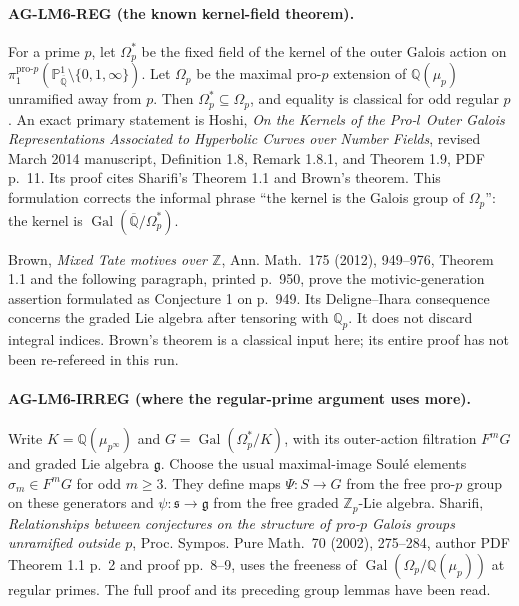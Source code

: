 \documentclass[11pt,a4paper]{article}
\begin{document}
\paragraph{AG-LM6-REG (the known kernel-field theorem).}
For a prime $p$, let $\Omega_p^*$ be the fixed field of the kernel
of the outer Galois action on
$\pi_1^{\mathrm{pro}\text{-}p}
(\mathbb P^1_{\overline{\mathbb Q}}\setminus\{0,1,\infty\})$.
Let $\Omega_p$ be the maximal pro-$p$ extension of
$\mathbb Q(\mu_p)$ unramified away from $p$. Then
$\Omega_p^*\subseteq\Omega_p$, and equality is classical for odd
regular $p$. An exact primary statement is Hoshi,
\emph{On the Kernels of the Pro-$l$ Outer Galois Representations
Associated to Hyperbolic Curves over Number Fields}, revised March
2014 manuscript, Definition 1.8, Remark 1.8.1, and Theorem 1.9,
PDF p.~11. Its proof cites Sharifi's Theorem 1.1 and Brown's theorem.
This formulation corrects the informal phrase ``the kernel is the
Galois group of $\Omega_p$'': the kernel is
$\operatorname{Gal}(\overline{\mathbb Q}/\Omega_p^*)$.

Brown, \emph{Mixed Tate motives over $\mathbb Z$}, Ann. Math.~175
(2012), 949--976, Theorem 1.1 and the following paragraph, printed
p.~950, prove the motivic-generation assertion formulated as
Conjecture 1 on p.~949. Its Deligne--Ihara consequence concerns the
graded Lie algebra after tensoring with $\mathbb Q_p$. It does not
discard integral indices. Brown's theorem is a classical input here;
its entire proof has not been re-refereed in this run.

\paragraph{AG-LM6-IRREG (where the regular-prime argument uses more).}
Write $K=\mathbb Q(\mu_{p^\infty})$ and
$G=\operatorname{Gal}(\Omega_p^*/K)$, with its outer-action
filtration $F^mG$ and graded Lie algebra $\mathfrak g$.
Choose the usual maximal-image Soulé elements $\sigma_m\in F^mG$
for odd $m\ge3$. They define maps $\Psi:S\to G$ from the free
pro-$p$ group on these generators and
$\psi:\mathfrak s\to\mathfrak g$ from the free graded
$\mathbb Z_p$-Lie algebra. Sharifi,
\emph{Relationships between conjectures on the structure of pro-$p$
Galois groups unramified outside $p$}, Proc. Sympos. Pure Math.~70
(2002), 275--284, author PDF Theorem 1.1 p.~2 and proof pp.~8--9,
uses the freeness of
$\operatorname{Gal}(\Omega_p/\mathbb Q(\mu_p))$ at regular primes.
The full proof and its preceding group lemmas have been read.
\end{document}
